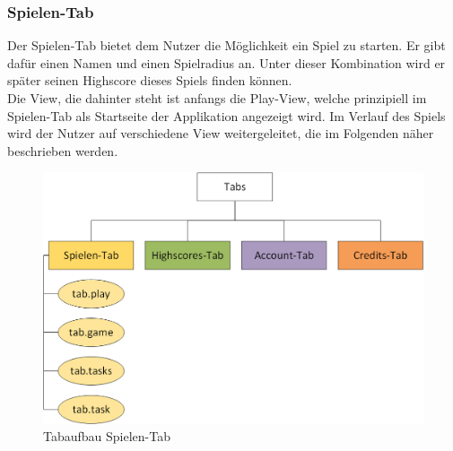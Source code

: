 \subsubsection{Spielen-Tab}
Der Spielen-Tab bietet dem Nutzer die Möglichkeit ein Spiel zu starten. Er gibt dafür einen Namen und einen Spielradius an. Unter dieser Kombination wird er später seinen Highscore dieses Spiels finden können. 
\\
Die View, die dahinter steht ist anfangs die Play-View, welche prinzipiell im Spielen-Tab als Startseite der Applikation angezeigt wird. Im Verlauf des Spiels wird der Nutzer auf verschiedene View weitergeleitet, die im Folgenden näher beschrieben werden. 
\begin{figure}[h]
\centering
\includegraphics[width=1\textwidth]{ref/images/tabs_spielen.png}
\caption[Tabaufbau Spielen-Tab]{Tabaufbau Spielen-Tab}
\label{fig:Tabaufbau Spielen-Tab}
\end{figure}

\newpage
